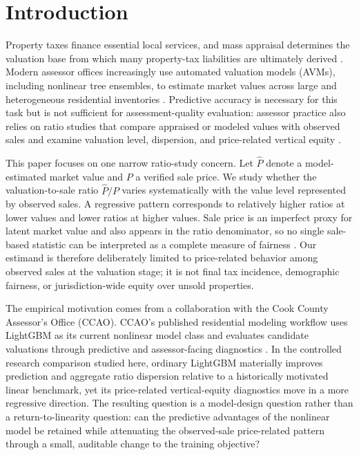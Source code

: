 \documentclass[10pt]{article}
\theoremstyle{definition}
\newcommand{\1}{\mathbf{1}}
\begin{document}
\section{Introduction}
\label{sec:introduction}

Property taxes finance essential local services, and mass appraisal determines the valuation base from which many property-tax liabilities are ultimately derived \cite{IAAO2020PropertyTaxPolicy,IAAO2025Mass}. Modern assessor offices increasingly use automated valuation models (AVMs), including nonlinear tree ensembles, to estimate market values across large and heterogeneous residential inventories \cite{IAAOAITaskForce2022,BidansetRakow2022,Rootetal2023,Sevgen2024100111,Zilli2024}. Predictive accuracy is necessary for this task but is not sufficient for assessment-quality evaluation: assessor practice also relies on ratio studies that compare appraised or modeled values with observed sales and examine valuation level, dispersion, and price-related vertical equity \cite{IAAO2013Ratio,IAAO2025Mass,IAAO2026ExposureRatio}.

This paper focuses on one narrow ratio-study concern. Let $\widehat P$ denote a model-estimated market value and $P$ a verified sale price. We study whether the valuation-to-sale ratio $\widehat P/P$ varies systematically with the value level represented by observed sales. A regressive pattern corresponds to relatively higher ratios at lower values and lower ratios at higher values. Sale price is an imperfect proxy for latent market value and also appears in the ratio denominator, so no single sale-based statistic can be interpreted as a complete measure of fairness \cite{McMillenSingh2023,IAAO2026ExposureRatio}. Our estimand is therefore deliberately limited to price-related behavior among observed sales at the valuation stage; it is not final tax incidence, demographic fairness, or jurisdiction-wide equity over unsold properties.

The empirical motivation comes from a collaboration with the Cook County Assessor's Office (CCAO). CCAO's published residential modeling workflow uses LightGBM as its current nonlinear model class and evaluates candidate valuations through predictive and assessor-facing diagnostics \cite{CCAOModelResAVM2026}. In the controlled research comparison studied here, ordinary LightGBM materially improves prediction and aggregate ratio dispersion relative to a historically motivated linear benchmark, yet its price-related vertical-equity diagnostics move in a more regressive direction. The resulting question is a model-design question rather than a return-to-linearity question: can the predictive advantages of the nonlinear model be retained while attenuating the observed-sale price-related pattern through a small, auditable change to the training objective?
\end{document}
